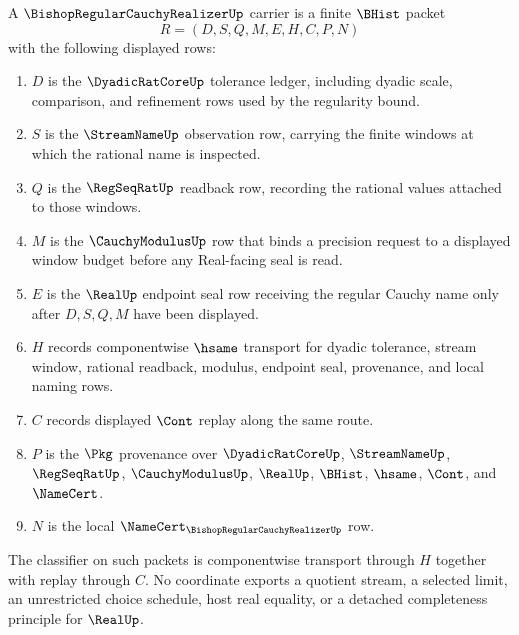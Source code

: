 \begin{definition}
\label{def:bishop-regular-cauchy-realizer-carrier}
A $\BishopRegularCauchyRealizerUp$ carrier is a finite $\BHist$ packet
$$
R=(D,S,Q,M,E,H,C,P,N)
$$
with the following displayed rows:
\begin{enumerate}
\item $D$ is the $\DyadicRatCoreUp$ tolerance ledger, including dyadic scale, comparison, and refinement rows used by the regularity bound.
\item $S$ is the $\StreamNameUp$ observation row, carrying the finite windows at which the rational name is inspected.
\item $Q$ is the $\RegSeqRatUp$ readback row, recording the rational values attached to those windows.
\item $M$ is the $\CauchyModulusUp$ row that binds a precision request to a displayed window budget before any Real-facing seal is read.
\item $E$ is the $\RealUp$ endpoint seal row receiving the regular Cauchy name only after $D,S,Q,M$ have been displayed.
\item $H$ records componentwise $\hsame$ transport for dyadic tolerance, stream window, rational readback, modulus, endpoint seal, provenance, and local naming rows.
\item $C$ records displayed $\Cont$ replay along the same route.
\item $P$ is the $\Pkg$ provenance over $\DyadicRatCoreUp$, $\StreamNameUp$, $\RegSeqRatUp$, $\CauchyModulusUp$, $\RealUp$, $\BHist$, $\hsame$, $\Cont$, and $\NameCert$.
\item $N$ is the local $\NameCert_{\BishopRegularCauchyRealizerUp}$ row.
\end{enumerate}
The classifier on such packets is componentwise transport through $H$ together with replay through $C$. No coordinate exports a quotient stream, a selected limit, an unrestricted choice schedule, host real equality, or a detached completeness principle for $\RealUp$.
\end{definition}

